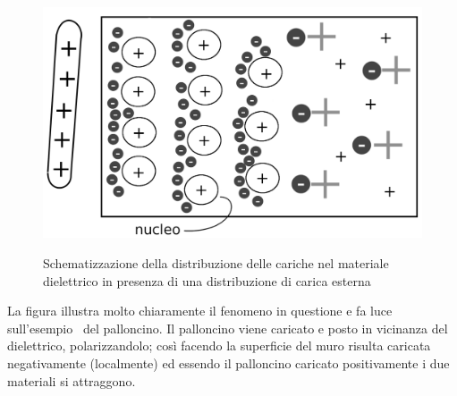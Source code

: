 \documentclass[11pt]{article}
\begin{document}
\begin{center}
\begin{figure}[H]
			  \vspace{-10pt}
              \hspace{-90pt}
              ~~~~~~~~~~~~~~~~~~~~~~~~~~~~~~~~~~ \includegraphics[scale=0.21]{dielettrico2}
               \caption{\small{Schematizzazione della distribuzione delle cariche nel materiale dielettrico in presenza di una distribuzione di carica esterna}}
               \end{figure} 
               \end{center}
               \vspace{-30pt}La figura illustra molto chiaramente il fenomeno in questione e fa luce sull'esempio ~del palloncino. Il palloncino viene caricato e posto in vicinanza del dielettrico, polarizzandolo; così facendo la superficie del muro risulta caricata negativamente (localmente) ed essendo il palloncino caricato positivamente i due materiali si attraggono.
\end{document}
